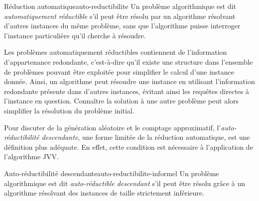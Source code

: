 
\begin{subdefinition}{Réduction automatique}{auto-reductibilite}
    Un problème algorithmique est dit \textit{automatiquement réductible} s'il peut être résolu par un algorithme résolvant d'autres instances du même problème, sans que l'algorithme puisse interroger l'instance particulière qu'il cherche à résoudre.
\end{subdefinition}

Les problèmes automatiquement réductibles contiennent de l'information d'appartenance redondante, c'est-à-dire qu'il existe une structure dans l'ensemble de problèmes pouvant être exploitée pour simplifier le calcul d'une instance donnée. Ainsi, un algorithme peut résoudre une instance en utilisant l'information redondante présente dans d'autres instances, évitant ainsi les requêtes directes à l'instance en question. Connaître la solution à une autre problème peut alors simplifier la résolution du problème initial. 


Pour discuter de la génération aléatoire et le comptage approximatif, l'\textit{auto-réductibilité descendante}, une forme limitée de la réduction automatique, est une définition plus adéquate. En effet, cette condition est nécessaire à l'application de l'algorithme JVV.

\begin{maindefinition}{Auto-réductibilité descendante}{auto-reductibilite-informel}
    Un problème algorithmique est dit \textit{auto-réductible descendant} s'il peut être résolu grâce à un algorithme résolvant des instances de taille strictement inférieure.
\end{maindefinition}


